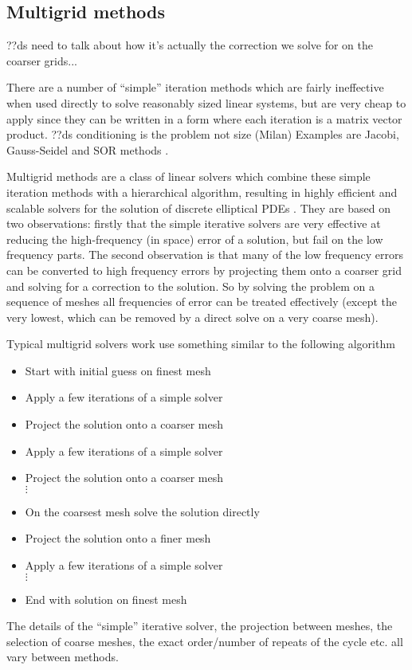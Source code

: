 \subsection{Multigrid methods}

??ds need to talk about how it's actually the correction we solve for on the coarser grids...

There are a number of ``simple'' iteration methods which are fairly ineffective when used directly to solve reasonably sized linear systems, but are very cheap to apply since they can be written in a form where each iteration is a matrix vector product.
??ds conditioning is the problem not size (Milan)
Examples are Jacobi, Gauss-Seidel and SOR methods \cite[103]{Saad2000}.

Multigrid methods are a class of linear solvers which combine these simple iteration methods with a hierarchical algorithm, resulting in highly efficient and scalable solvers for the solution of discrete elliptical PDEs \cite{multigrid-tut}.
They are based on two observations: firstly that the simple iterative solvers are very effective at reducing the high-frequency (in space) error of a solution, but fail on the low frequency parts.
The second observation is that many of the low frequency errors can be converted to high frequency errors by projecting them onto a coarser grid and solving for a correction to the solution.
So by solving the problem on a sequence of meshes all frequencies of error can be treated effectively (except the very lowest, which can be removed by a direct solve on a very coarse mesh).

Typical multigrid solvers work use something similar to the following algorithm
\begin{itemize}
\item Start with initial guess on finest mesh
\item Apply a few iterations of a simple solver
\item Project the solution onto a coarser mesh
\item Apply a few iterations of a simple solver
\item Project the solution onto a coarser mesh \\
  $\vdots$
\item On the coarsest mesh solve the solution directly
\item Project the solution onto a finer mesh
\item Apply a few iterations of a simple solver \\
  $\vdots$
\item End with solution on finest mesh
\end{itemize}
The details of the ``simple'' iterative solver, the projection between meshes, the selection of coarse meshes, the exact order/number of repeats of the cycle etc. all vary between methods.


